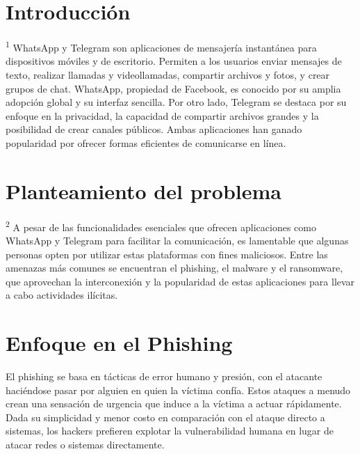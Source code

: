 \documentclass[letterpaper, 12pt]{article}
\begin{document}
\section{Introducción}

\textsuperscript{1} WhatsApp y Telegram son aplicaciones de mensajería
instantánea para dispositivos móviles y de escritorio.
Permiten a los usuarios enviar mensajes de texto, realizar
llamadas y videollamadas, compartir archivos y fotos, y
crear grupos de chat. WhatsApp, propiedad de Facebook, es
conocido por su amplia adopción global y su interfaz
sencilla. Por otro lado, Telegram se destaca por su enfoque
en la privacidad, la capacidad de compartir archivos
grandes y la posibilidad de crear canales públicos. Ambas
aplicaciones han ganado popularidad por ofrecer formas
eficientes de comunicarse en línea.


\section{Planteamiento del problema}

\textsuperscript{2} A pesar de las funcionalidades esenciales que ofrecen
aplicaciones como WhatsApp y Telegram para facilitar la
comunicación, es lamentable que algunas personas opten por
utilizar estas plataformas con fines maliciosos. Entre las
amenazas más comunes se encuentran el phishing, el malware
y el ransomware, que aprovechan la interconexión y la
popularidad de estas aplicaciones para llevar a cabo
actividades ilícitas.


\section{Enfoque en el Phishing}

El phishing se basa en tácticas de error humano y presión,
con el atacante haciéndose pasar por alguien en quien la
víctima confía. Estos ataques a menudo crean una sensación
de urgencia que induce a la víctima a actuar rápidamente.
Dada su simplicidad y menor costo en comparación con el
ataque directo a sistemas, los hackers prefieren explotar
la vulnerabilidad humana en lugar de atacar redes o
sistemas directamente.
\end{document}
